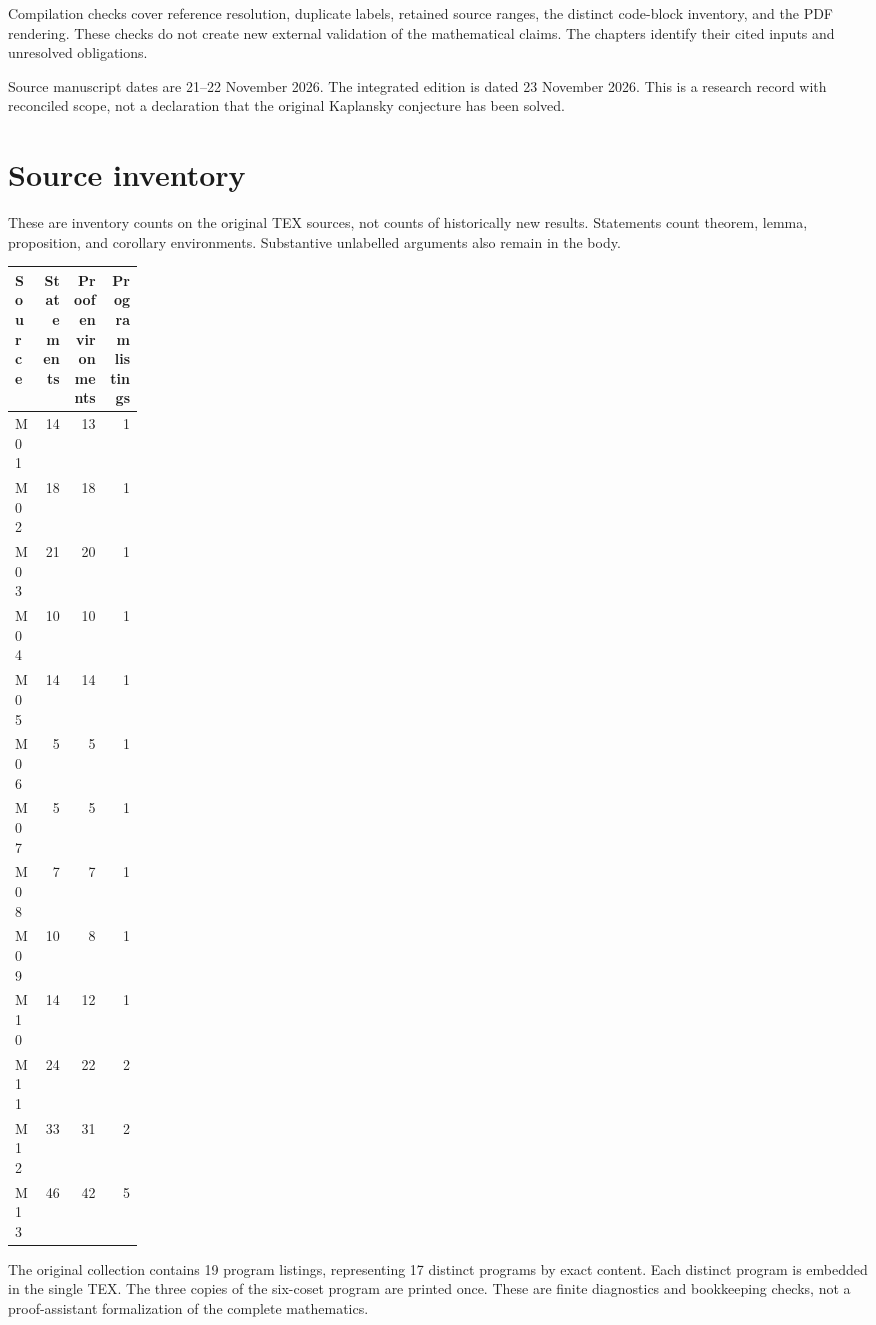 \documentclass[11pt,a4paper,oneside]{report}
\theoremstyle{definition}
\theoremstyle{remark}
\begin{document}
Compilation checks cover reference resolution, duplicate labels,
retained source ranges, the distinct code-block inventory,
and the PDF rendering. These checks do not create new external
validation of the mathematical claims. The chapters identify
their cited inputs and unresolved obligations.

Source manuscript dates are 21--22 November 2026. The integrated
edition is dated 23 November 2026. This is a research record
with reconciled scope, not a declaration that the original
Kaplansky conjecture has been solved.
\section{Source inventory}
These are inventory counts on the original TEX sources, not counts
of historically new results. Statements count theorem, lemma,
proposition, and corollary environments. Substantive unlabelled
arguments also remain in the body.
\begin{longtable}{P{0.15\linewidth}r r r}
\toprule Source & Statements & Proof environments & Program listings\\
\midrule\endhead
M01 & 14 & 13 & 1\\
M02 & 18 & 18 & 1\\
M03 & 21 & 20 & 1\\
M04 & 10 & 10 & 1\\
M05 & 14 & 14 & 1\\
M06 & 5 & 5 & 1\\
M07 & 5 & 5 & 1\\
M08 & 7 & 7 & 1\\
M09 & 10 & 8 & 1\\
M10 & 14 & 12 & 1\\
M11 & 24 & 22 & 2\\
M12 & 33 & 31 & 2\\
M13 & 46 & 42 & 5\\
\bottomrule\end{longtable}
The original collection contains 19 program listings, representing 17 distinct programs by exact content. Each distinct program is
embedded in the single TEX. The three copies of the six-coset
program are printed once. These are finite diagnostics and
bookkeeping checks, not a proof-assistant formalization of
the complete mathematics.
\end{document}
